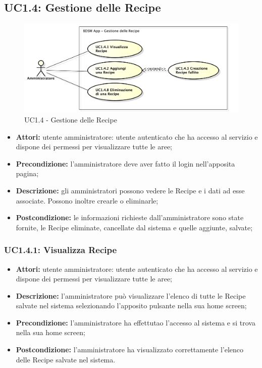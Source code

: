 \pagebreak


\subsection{UC1.4: Gestione delle Recipe}

\begin{figure}[!ht]
    \centering
    \centerline{\includegraphics[scale=0.5]{./images/UC1_4.pdf}}
    \caption{UC1.4 - Gestione delle Recipe}
\end{figure}

\begin{itemize}
    \item \textbf{Attori:} utente amministratore: utente autenticato che ha accesso al servizio e dispone dei permessi per visualizzare tutte le aree;

    \item \textbf{Precondizione:} l'amministratore deve aver fatto il login nell'apposita pagina;

    \item \textbf{Descrizione:} gli amministratori possono vedere le Recipe e i dati ad esse associate. Possono inoltre crearle o eliminarle;

    \item \textbf{Postcondizione:} le informazioni richieste dall'amministratore sono state fornite, le Recipe eliminate, cancellate dal sistema e quelle aggiunte, salvate;
\end{itemize}

\subsubsection{UC1.4.1: Visualizza Recipe}

\begin{itemize}
    \item \textbf{Attori:} utente amministratore: utente autenticato che ha accesso al servizio e dispone dei permessi per visualizzare tutte le aree;
    \item \textbf{Descrizione:} l'amministratore può visualizzare l'elenco di tutte le Recipe salvate nel sistema selezionando l'apposito pulsante nella sua home screen;
    \item \textbf{Precondizione:} l'amministratore ha effettutao l'accesso al sistema e si trova nella sua home screen;
    \item \textbf{Postcondizione:} l'amministratore ha visualizzato correttamente l'elenco delle Recipe salvate nel sistema.
\end{itemize}

